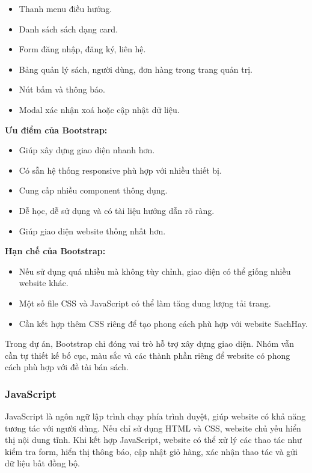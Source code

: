 \begin{itemize}
	\item Thanh menu điều hướng.
	\item Danh sách sách dạng card.
	\item Form đăng nhập, đăng ký, liên hệ.
	\item Bảng quản lý sách, người dùng, đơn hàng trong trang quản trị.
	\item Nút bấm và thông báo.
	\item Modal xác nhận xoá hoặc cập nhật dữ liệu.
\end{itemize}

\textbf{Ưu điểm của Bootstrap:}

\begin{itemize}
	\item Giúp xây dựng giao diện nhanh hơn.
	\item Có sẵn hệ thống responsive phù hợp với nhiều thiết bị.
	\item Cung cấp nhiều component thông dụng.
	\item Dễ học, dễ sử dụng và có tài liệu hướng dẫn rõ ràng.
	\item Giúp giao diện website thống nhất hơn.
\end{itemize}

\textbf{Hạn chế của Bootstrap:}

\begin{itemize}
	\item Nếu sử dụng quá nhiều mà không tùy chỉnh, giao diện có thể giống nhiều website khác.
	\item Một số file CSS và JavaScript có thể làm tăng dung lượng tải trang.
	\item Cần kết hợp thêm CSS riêng để tạo phong cách phù hợp với website SachHay.
\end{itemize}

Trong dự án, Bootstrap chỉ đóng vai trò hỗ trợ xây dựng giao diện. Nhóm vẫn cần tự thiết kế bố cục, màu sắc và các thành phần riêng để website có phong cách phù hợp với đề tài bán sách.

\subsubsection{JavaScript}

JavaScript là ngôn ngữ lập trình chạy phía trình duyệt, giúp website có khả năng tương tác với người dùng. Nếu chỉ sử dụng HTML và CSS, website chủ yếu hiển thị nội dung tĩnh. Khi kết hợp JavaScript, website có thể xử lý các thao tác như kiểm tra form, hiển thị thông báo, cập nhật giỏ hàng, xác nhận thao tác và gửi dữ liệu bất đồng bộ.

